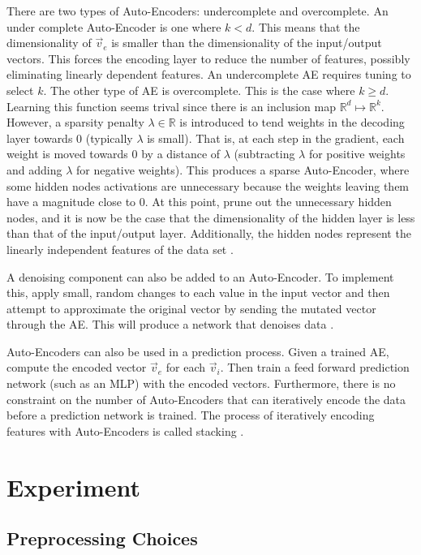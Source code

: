 \documentclass[twoside,11pt]{article}
\begin{document}
	There are two types of Auto-Encoders: undercomplete and overcomplete. 
	An under complete Auto-Encoder is one where $k < d$. This means that the dimensionality of $\vec{v}_e$ is smaller than the dimensionality of the input/output vectors. 
	This forces the encoding layer to reduce the number of features, possibly eliminating linearly dependent features. 
	An undercomplete AE requires tuning to select $k$.
	The other type of AE is overcomplete. This is the case where $k \geq d$.
	Learning this function seems trival since there is an inclusion map $\mathbb{R}^d \mapsto \mathbb{R}^k$.
	However, a sparsity penalty $\lambda \in \mathbb{R}$ is introduced to tend weights in the decoding layer towards 0 (typically $\lambda$ is small).
	That is, at each step in the gradient, each weight is moved towards 0 by a distance of $\lambda$ (subtracting $\lambda$ for positive weights and adding $\lambda$ for negative weights).
	This produces a sparse Auto-Encoder, where some hidden nodes activations are unnecessary because the weights leaving them have a magnitude close to 0.
	At this point, prune out the unnecessary hidden nodes, and it is now be the case that the dimensionality of the hidden layer is less than that of the input/output layer.
	Additionally, the hidden nodes represent the linearly independent features of the data set \citep{sparsity}.
	
	A denoising component can also be added to an Auto-Encoder. To implement this, apply small, random changes to each value in the input vector and then attempt to approximate the original vector by sending the mutated vector through the AE. This will produce a network that denoises data \citep{stacked-ae}.
	
	Auto-Encoders can also be used in a prediction process. Given a trained AE, compute the encoded vector  $\vec{v}_e$ for each $\vec{v}_i$. 
	Then train a feed forward prediction network (such as an MLP) with the encoded vectors. 
	Furthermore, there is no constraint on the number of Auto-Encoders that can iteratively encode the data before a prediction network is trained. 
	The process of iteratively encoding features with Auto-Encoders is called stacking \citep{stacked-ae}.
		
\section{Experiment}

\subsection{Preprocessing Choices}
\end{document}
